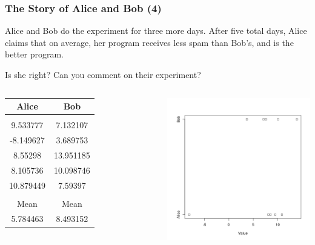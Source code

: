 \documentclass[10pt]{beamer}
\begin{document}
\begin{frame}
  \frametitle{The Story of Alice and Bob (4)}
  \begin{block}{}
    Alice and Bob do the experiment for three more days. After five
    total days, Alice claims that on average, her program receives less
    spam than Bob's, and is the better program.

    \smallskip

    \alert{Is she right? Can you comment on their experiment?}
  \end{block}
  \begin{columns}[c]
    \begin{tabular}{c|c}
      Alice & Bob \\
      \hline\\
      9.533777 & 7.132107\\
      -8.149627 & 3.689753\\
      8.55298 & 13.951185\\
      8.105736 & 10.098746\\
      10.879449 & 7.59397\\
      \hline
      \hline\\
      Mean & Mean\\
      5.784463 & 8.493152\\
    \end{tabular}
    \includegraphics[width=1\textwidth]{img/AliceBob_5}
  \end{columns}
\end{frame}
\end{document}

